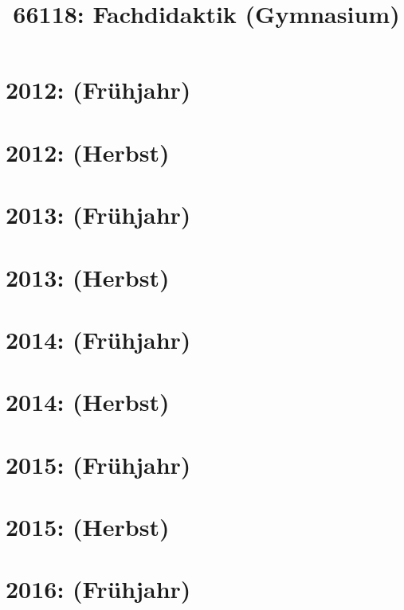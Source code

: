 \documentclass{lehramt-informatik-haupt}
\title{66118: Fachdidaktik (Gymnasium)}
\begin{document}
\maketitle
\tableofcontents

\section{2012: (Frühjahr)}


\section{2012: (Herbst)}


\section{2013: (Frühjahr)}


\section{2013: (Herbst)}


\section{2014: (Frühjahr)}


\section{2014: (Herbst)}


\section{2015: (Frühjahr)}


\section{2015: (Herbst)}


\section{2016: (Frühjahr)}

\end{document}
